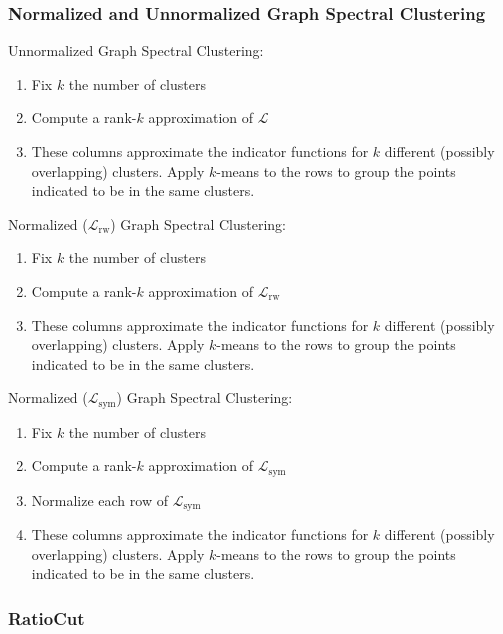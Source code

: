 \documentclass{article}
\newcommand{\an}[1]{{\leavevmode\color{red}{#1}}}
\begin{document}
\subsubsection*{Normalized and Unnormalized Graph Spectral Clustering}
Unnormalized Graph Spectral Clustering:
\begin{enumerate}
    \item Fix $k$ the number of clusters
    \item Compute a rank-$k$ approximation of $\mathcal{L}$
    \item These columns approximate the indicator functions for $k$ different (possibly overlapping) clusters. Apply $k$-means to the rows to group the points indicated to be in the same clusters.  \an{What columns? You constructed a matrix above. What exactly are the ``columns'' you're referring to?}
\end{enumerate}
Normalized ($\mathcal{L}_{\text{rw}}$) Graph Spectral Clustering:
\begin{enumerate}
    \item Fix $k$ the number of clusters
    \item Compute a rank-$k$ approximation of $\mathcal{L}_{\text{rw}}$
    \item These columns approximate the indicator functions for $k$ different (possibly overlapping) clusters. Apply $k$-means to the rows to group the points indicated to be in the same clusters. 
\end{enumerate}
Normalized ($\mathcal{L}_{\text{sym}}$) Graph Spectral Clustering:
\begin{enumerate}
    \item Fix $k$ the number of clusters
    \item Compute a rank-$k$ approximation of $\mathcal{L}_{\text{sym}}$
    \item Normalize each row of $\mathcal{L}_{\text{sym}}$
    \item These columns approximate the indicator functions for $k$ different (possibly overlapping) clusters. Apply $k$-means to the rows to group the points indicated to be in the same clusters. 
\end{enumerate}

\subsubsection*{RatioCut}
\end{document}
